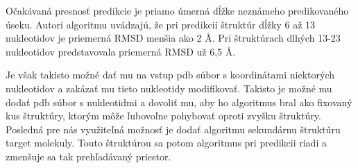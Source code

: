 \indent Očakávaná presnosť predikcie je priamo úmerná dĺžke neznámeho predikovaného úseku. Autori algoritmu uvádzajú, že pri predikcií štruktúr dĺžky 6 až 13 nukleotidov je priemerná RMSD menšia ako 2 Å. Pri štruktúrach dlhých 13-23 nukleotidov predstavovala priemerná RMSD už 6,5 Å.


\indent Je však takisto možné dať mu na vstup pdb súbor s koordinátami niektorých nukleotidov a zakázať mu tieto nukleotidy modifikovať. 
Takisto je možné mu dodať pdb súbor s nukleotidmi a dovoliť mu, aby ho algoritmus bral ako fixovaný kus štruktúry, ktorým môže ľubovoľne pohybovať oproti zvyšku štruktúry.
Posledná pre nás využiteľná možnosť je dodať algoritmu sekundárnu štruktúru target molekuly. Touto štruktúrou sa potom algoritmus pri predikcii riadi a zmenšuje sa tak prehľadávaný priestor.

